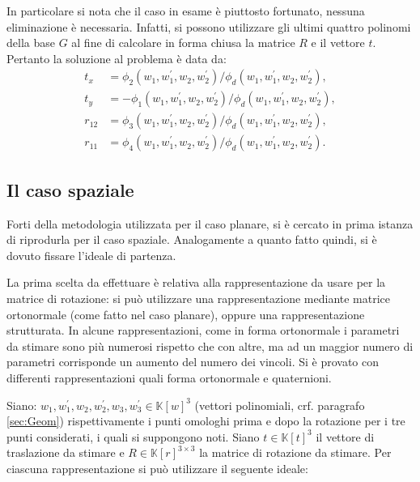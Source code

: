 In particolare si nota che il caso in esame è piuttosto fortunato, nessuna eliminazione è necessaria. Infatti, si possono utilizzare gli ultimi quattro polinomi della base $G$ al fine di calcolare in forma chiusa la matrice $R$ e il vettore $t$.
Pertanto la soluzione al problema è data da:
\begin{align}
	t_x &= \phi_2(w_1, w_1^{'}, w_2, w_2^{'})/\phi_d(w_1, w_1^{'}, w_2, w_2^{'}),\\
	t_y &= - \phi_1(w_1, w_1^{'}, w_2, w_2^{'})/\phi_d(w_1, w_1^{'}, w_2, w_2^{'}),\\
	r_{12} &= \phi_3(w_1, w_1^{'}, w_2, w_2^{'})/\phi_d(w_1, w_1^{'}, w_2, w_2^{'}),\\
	r_{11} &= \phi_4(w_1, w_1^{'}, w_2, w_2^{'})/\phi_d(w_1, w_1^{'}, w_2, w_2^{'}).
\end{align}
\subsection{Il caso spaziale}
\label{sec:groeb:spaz}

Forti della metodologia utilizzata per il caso planare, si è cercato in prima istanza di riprodurla per il caso spaziale. Analogamente a quanto fatto quindi, si è dovuto fissare l'ideale di partenza. 

La prima scelta da effettuare è relativa alla rappresentazione da usare per la matrice di rotazione: si può utilizzare una rappresentazione mediante matrice ortonormale (come fatto nel caso planare), oppure una rappresentazione strutturata. In alcune rappresentazioni, come in forma ortonormale i parametri da stimare sono più numerosi rispetto che con altre, ma ad un maggior numero di parametri corrisponde un aumento del numero dei vincoli. 
Si è provato con differenti rappresentazioni quali forma ortonormale e quaternioni.

Siano: $w_1, w_1^{'}, w_2, w_2^{'}, w_3, w_3^{'} \in \mathbb{K}[w]^3$ (vettori polinomiali, crf. paragrafo \ref{sec:Geom}) rispettivamente i punti omologhi prima e dopo la rotazione per i tre punti considerati, i quali si suppongono noti. Siano $t \in \mathbb{K}[t]^3$ il vettore di traslazione da stimare e $R \in \mathbb{K}[r]^{3 \times 3}$ la matrice di rotazione da stimare. Per ciascuna rappresentazione si può utilizzare il seguente ideale:

